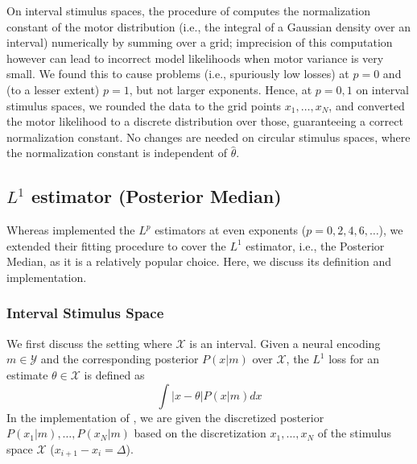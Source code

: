 On interval stimulus spaces, the procedure of \citet{hahn2024unifying} computes the normalization constant of the motor distribution (i.e., the integral of a Gaussian density over an interval) numerically by summing over a grid; imprecision of this computation however can lead to incorrect model likelihoods when motor variance is very small. We found this to cause problems (i.e., spuriously low losses) at $p=0$ and (to a lesser extent) $p=1$, but not larger exponents. Hence, at $p=0,1$ on interval stimulus spaces, we rounded the data to the grid points $x_1, \dots, x_N$, and converted the motor likelihood to a discrete distribution over those, guaranteeing a correct normalization constant. No changes are needed on circular stimulus spaces, where the normalization constant is independent of $\widehat{\theta}$.



\subsection{$L^1$ estimator (Posterior Median)}\label{sec:median}

Whereas \citet{hahn2024unifying} implemented the $L^p$ estimators at even exponents ($p=0,2,4,6,\dots$), we extended their fitting procedure  to cover the $L^1$ estimator, i.e., the Posterior Median, as it is a relatively popular choice.
Here, we discuss its definition and implementation.


\subsubsection*{Interval Stimulus Space}
We first discuss the setting where $\mathcal{X}$ is an interval.
Given a neural encoding $m \in \mathcal{Y}$ and the corresponding posterior $P(x|m)$ over $\mathcal{X}$, the $L^1$ loss for an estimate $\theta \in \mathcal{X}$ is defined as
\begin{equation}\label{eq:l1-loss}
    \int |x-\theta| P(x|m) dx
\end{equation}
In the implementation of \citet{hahn2024unifying}, we are given the discretized posterior $P(x_1|m), \dots, P(x_N|m)$ based on the discretization $x_1, ..., x_N$ of the stimulus space $\mathcal{X}$ ($x_{i+1}-x_i = \Delta$).






